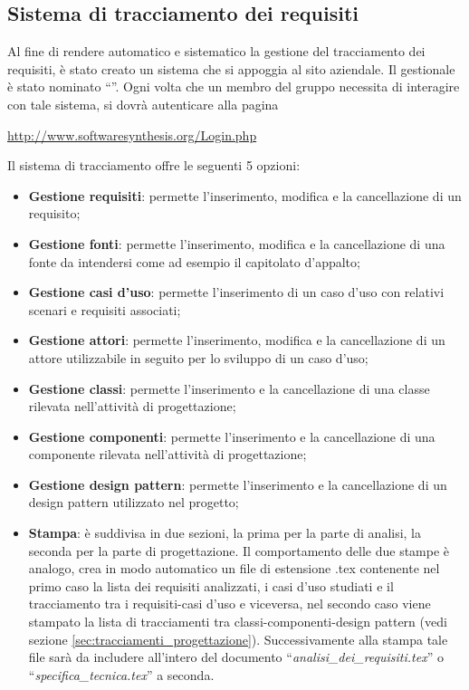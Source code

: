 \subsection{Sistema di tracciamento dei requisiti}
\label{sec:tracciamento}
Al fine di rendere automatico e sistematico la gestione del tracciamento dei requisiti, è stato creato un sistema che si appoggia al sito aziendale. Il gestionale è stato nominato ``\manager{}''. Ogni volta che un membro del gruppo necessita di interagire con tale sistema, si dovrà autenticare alla pagina

\begin{center}
\url{http://www.softwaresynthesis.org/Login.php}
\end{center}

Il sistema di tracciamento offre le seguenti 5 opzioni:
\begin{itemize}
\item \textbf{Gestione requisiti}: permette l'inserimento, modifica e la cancellazione di un requisito;
\item \textbf{Gestione fonti}: permette l'inserimento, modifica e la cancellazione di una fonte da intendersi come ad esempio il capitolato d'appalto;
\item \textbf{Gestione casi d'uso}: permette l'inserimento di un caso d'uso con relativi scenari  e requisiti associati;
\item \textbf{Gestione attori}: permette l'inserimento, modifica e la cancellazione di un attore utilizzabile in seguito per lo sviluppo di un caso d'uso;
\item \textbf{Gestione classi}: permette l'inserimento e la cancellazione di una classe rilevata nell'attività di progettazione;
\item \textbf{Gestione componenti}: permette l'inserimento e la cancellazione di una componente rilevata nell'attività di progettazione;
\item \textbf{Gestione design pattern}: permette l'inserimento e la cancellazione di un design pattern utilizzato nel progetto;

\item \textbf{Stampa}: è suddivisa in due sezioni, la prima per la parte di analisi, la seconda per la parte di progettazione. Il comportamento delle due stampe è analogo, crea in modo automatico un file di estensione .tex contenente nel primo caso la lista dei requisiti analizzati, i casi d'uso studiati e il tracciamento tra i requisiti-casi d'uso e viceversa, nel secondo caso viene stampato la lista di tracciamenti tra classi-componenti-design pattern (vedi sezione \ref{sec:tracciamenti_progettazione}). Successivamente alla stampa tale file sarà da includere all'intero del documento ``\textit{analisi\_dei\_requisiti.tex}'' o ``\textit{specifica\_tecnica.tex}'' a seconda.
\end{itemize}
